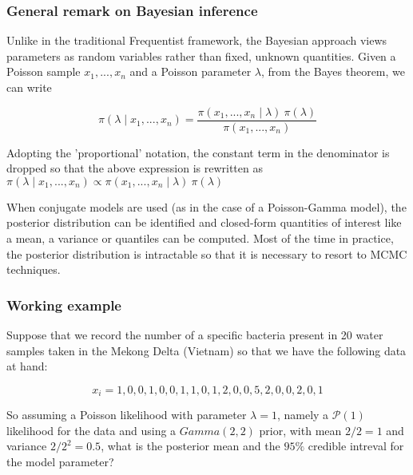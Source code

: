 \documentclass[border=5mm, convert, usenames, dvipsnames,beamer]{standalone}
\begin{document}
\begin{frame}
\frametitle{General remark on Bayesian inference}

\vspace{40}
\noindent
Unlike in the traditional Frequentist framework, the Bayesian approach views parameters as random variables rather than fixed, unknown quantities. Given a Poisson sample 
$x_{1},...,x_{n}$ and a Poisson parameter $\lambda$, from the Bayes theorem, we can write 

$$
\pi(\lambda \mid x_{1},...,x_{n}) = \frac{\pi( x_{1},...,x_{n}  \mid \lambda ) \  \pi( \lambda)}{ \pi(x_{1},...,x_{n})  }  
$$

\noindent
Adopting the 'proportional' notation, the constant term in the denominator is dropped so that the above expression is rewritten as $\pi(\lambda \mid x_{1},...,x_{n}) \propto  \pi( x_{1},...,x_{n}  \mid \lambda ) \  \pi( \lambda)$

\vspace{5}
\noindent
When conjugate models are used (as in the case of a Poisson-Gamma model), the posterior distribution can be identified and closed-form quantities of interest like a mean, a variance or quantiles can be computed. Most of the time in practice, the posterior distribution is intractable so that it is necessary to resort to MCMC techniques.


\par
\end{frame}




\begin{frame}
\frametitle{Working example}

\vspace{30}
\noindent
Suppose that we record the number of a specific bacteria present in 20 water samples taken in the Mekong Delta (Vietnam) so that we have the following data at hand:

$$
x_{i} = 1, 0, 0, 1, 0, 0, 1, 1, 0, 1, 2, 0, 0, 5, 2, 0, 0, 2, 0, 1
$$

\vspace{10}
\noindent
So assuming a Poisson likelihood with parameter $\lambda =1$, namely a $\mathcal{P}(1)$ likelihood for the data and using a $Gamma(2,2)$ prior, with mean $2/2=1$ and variance $2/2^2 = 0.5$, what is the posterior mean and the $95 \%$ credible intreval for the model parameter?



\par
\end{frame}
\end{document}
